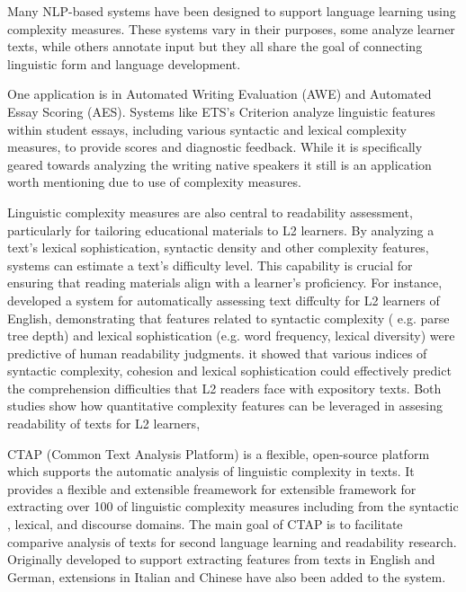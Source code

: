 Many NLP-based systems have been designed to support language learning using complexity measures. These systems vary
in their purposes, some analyze learner texts, while others annotate input but they all
share
the goal
of connecting linguistic form and language development.

One application is in Automated Writing Evaluation (AWE) and Automated Essay Scoring (AES). Systems like
ETS's Criterion \citep{criterion2006} analyze linguistic features within student essays, including various syntactic
and lexical complexity measures, to provide scores and diagnostic feedback. While it is specifically geared towards
analyzing the writing native speakers it still is an application worth mentioning due to use of complexity measures.

Linguistic complexity measures are also central to readability assessment, particularly for tailoring educational
materials to L2 learners. By analyzing a text's lexical sophistication, syntactic density and other complexity
features, systems can estimate a text's difficulty level. This capability is crucial for ensuring that reading
materials align with a learner's proficiency. For instance, \citet{vajjala2012} developed a system for automatically
assessing text diffculty for L2 learners of English, demonstrating that features related to syntactic complexity (
e.g. parse tree depth) and lexical sophistication (e.g. word frequency, lexical diversity) were predictive of human
readability judgments. \citet{crossley2014} it showed that various indices of syntactic complexity, cohesion and
lexical sophistication
could effectively predict the comprehension difficulties that L2 readers face with expository texts. Both studies
show how quantitative complexity features can be leveraged in assesing readability of texts for L2 learners,


CTAP (Common Text Analysis Platform) \citep{ctap} is a flexible, open-source platform which supports the automatic
analysis of linguistic complexity in texts.  It provides a flexible and extensible freamework for extensible
framework for extracting over 100 of linguistic complexity measures including from the syntactic , lexical,
and
discourse domains. The main goal of CTAP is to facilitate comparive analysis of texts for second language learning
and readability research. Originally developed to support extracting features from texts in English and German,
extensions in Italian \citep{ctap-italian} and Chinese \citep{ctap-chinese} have also been added to the system.

